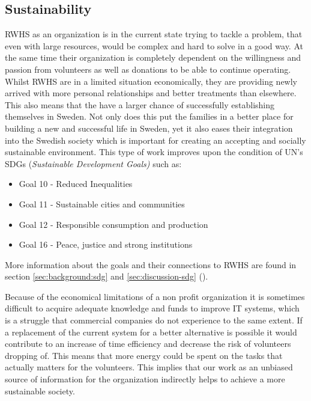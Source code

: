 \subsection{Sustainability}
\label{sec:introduction:sustainability}
RWHS as an organization is in the current state trying to tackle a problem, that even with large resources, would be complex and hard to solve in a good way. At the same time their organization is completely dependent on the willingness and passion from volunteers as well as donations to be able to continue operating. Whilst RWHS are in a limited situation economically, they are providing newly arrived  with more personal relationships and better treatments than elsewhere. This also means that the  have a larger chance of successfully establishing themselves in Sweden. Not only does this put the families in a better place for building a new and successful life in Sweden, yet it also eases their integration into the Swedish society which is important for creating an accepting and socially sustainable environment. This type of work improves upon the condition of UN's SDGs
(\textit{Sustainable Development Goals)} \cite{UnitedNations} such as: 
\begin{itemize}
\item Goal 10 - Reduced Inequalities
\item Goal 11 - Sustainable cities and communities 
\item Goal 12 - Responsible consumption and production
 \item Goal 16 - Peace, justice and strong institutions
\end{itemize}
More information about the goals and their connections to RWHS are found in section \ref{sec:background:sdg} and \ref{sec:discussion-sdg} (\textit{}).

Because of the economical limitations of a non profit organization it is sometimes difficult to acquire adequate knowledge and funds to improve IT systems, which is a struggle that commercial companies do not experience to the same extent. If a replacement of the current system for a better alternative is possible it would contribute to an increase of time efficiency and decrease the risk of volunteers dropping of. This means that more energy could be spent on the tasks that actually matters for the volunteers. This implies that our work as an unbiased source of information for the organization indirectly helps to achieve a more sustainable society. 